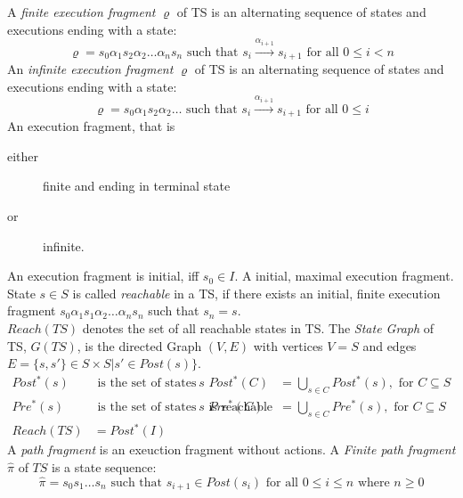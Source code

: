 \documentclass[a4paper, 10pt]{article}
\begin{document}
\begin{mdframed}[roundcorner=5pt,
subtitlebelowline=false,subtitleaboveline=false,
subtitlebackgroundcolor=blue!30,
frametitlerule=true,
frametitlebackgroundcolor=blue!30,
frametitle={Finite Execution Fragment}
]
A \emph{finite execution fragment} $\varrho$ of TS is an alternating sequence of states and executions ending with a state:
\[ \varrho=s_0\alpha_1 s_2 \alpha_2\dots\alpha_n s_n \text{ such that } s_i\overset{\alpha_{i+1}}{\longrightarrow} s_{i+1} \text{ for all } 0\leq i<n \]
An \emph{infinite execution fragment} $\varrho$ of TS is an alternating sequence of states and executions ending with a state:
\[ \varrho=s_0\alpha_1 s_2 \alpha_2\dots \text{ such that } s_i\overset{\alpha_{i+1}}{\longrightarrow} s_{i+1} \text{ for all } 0\leq i \]
An execution fragment, that is
\begin{description}
    \item[either] finite and ending in terminal state
    \item[or] infinite.
\end{description}
An execution fragment is initial, iff $s_0\in I$.
A initial, maximal execution fragment.
State $s\in S$ is called \emph{reachable} in a TS, if there exists an initial, finite execution fragment $s_0\alpha_1 s_1\alpha_2\dots\alpha_n s_n$ such that $s_n=s$.\\
$Reach(TS)$ denotes the set of all reachable states in TS.
The \emph{State Graph} of TS, $G(TS)$, is the directed Graph $(V,E)$ with vertices $V=S$ and edges $E=\{s,s'\}\in S\times S | s'\in Post(s)\}$.
\begin{align*}
Post^*(s) & \text{ is the set of states reachable from } s &
Post^*(C) &= \bigcup_{s\in C} Post^*(s), \text{ for } C\subseteq S \\
Pre^*(s) & \text{ is the set of states from which } s \text{ is reachable} &
Pre^*(C) &= \bigcup_{s\in C} Pre^*(s), \text{ for } C\subseteq S \\
Reach(TS) &= Post^*(I)
\end{align*}
A \emph{path fragment} is an exeuction fragment without actions.
A \emph{Finite path fragment} $\hat{\pi}$ of $TS$ is a state sequence:
\[ \hat{\pi} = s_0s_1\dots s_n \text{ such that } s_{i+1}\in Post(s_i) \text{ for all } 0\leq i\leq n \text{ where } n\geq0\]

\end{mdframed}
\end{document}

